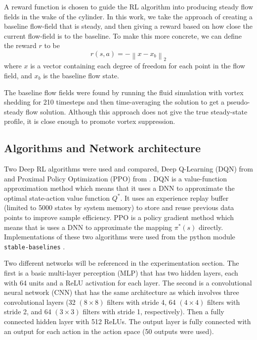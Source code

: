 \documentclass{article}
\begin{document}
A reward function is chosen to guide the RL algorithm into producing steady flow fields in the wake of the cylinder. In this work, we take the approach of creating a baseline flow-field that is steady, and then giving a reward based on how close the current flow-field is to the baseline. To make this more concrete, we can define the reward $r$ to be 
\begin{equation}
    r(s,a) = -\left\lVert x - x_b \right\rVert_2
\end{equation}
where $x$ is a vector containing each degree of freedom for each point in the flow field, and $x_b$ is the baseline flow state.

The baseline flow fields were found by running the fluid simulation with vortex shedding for \num{210} timesteps and then time-averaging the solution to get a pseudo-steady flow solution. Although this approach does not give the true steady-state profile, it is close enough to promote vortex suppression.

\subsection{Algorithms and Network architecture}
\label{sec:algs}
Two Deep RL algorithms were used and compared, Deep Q-Learning (DQN) from \cite{mnih2013playing} and Proximal Policy Optimization (PPO) from \cite{schulman2017proximal}.  DQN is a value-function approximation method which means that it uses a DNN to approximate the optimal state-action value function $Q^*$. It uses an experience replay buffer (limited to \num{5000} states by system memory) to store and reuse previous data points to improve sample efficiency. PPO is a policy gradient method which means that is uses a DNN to approximate the mapping $\pi^*(s)$ directly. Implementations of these two algorithms were used from the python module \verb|stable-baselines| \cite{stable-baselines}.


Two different networks will be referenced in the experimentation section. The first is a basic multi-layer perception (MLP) that has two hidden layers, each with 64 units and a ReLU activation for each layer. The second is a convolutional neural network (CNN) that has the same architecture as \cite{mnih2015human} which involves three convolutional layers (\num{32} $(8 \times 8)$ filters with stride \num{4},  \num{64} $(4 \times 4)$ filters with stride \num{2}, and \num{64} $(3 \times 3)$ filters with stride \num{1}, respectively). Then a fully connected hidden layer with 512 ReLUs. The output layer is fully connected with an output for each action in the action space (50 outputs were used). 
\end{document}
